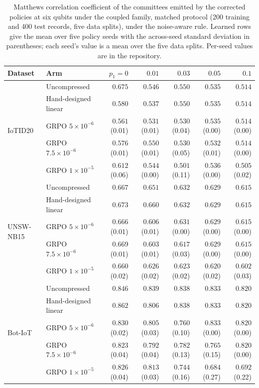 \begin{table}[t]
\centering
\footnotesize
\setlength{\tabcolsep}{2.5pt}
\caption{Matthews correlation coefficient of the committees emitted by the corrected policies at
six qubits under the coupled family, matched protocol (200 training and 400 test records, five data splits),
under the noise-aware rule.
Learned rows give the mean over five policy seeds with the across-seed standard deviation in
parentheses; each seed's value is a mean over the five data splits.
Per-seed values are in the repository.}
\label{tab:compdownstream-nwe}
\begin{tabular}{@{}llrrrrr@{}}
\toprule
Dataset & Arm & $p_1 = 0$ & $0.01$ & $0.03$ & $0.05$ & $0.1$ \\
\midrule
\multirow{5}{*}{IoTID20}
 & Uncompressed & $0.675$ & $0.546$ & $0.550$ & $0.535$ & $0.514$ \\
 & Hand-designed linear & $0.580$ & $0.537$ & $0.550$ & $0.535$ & $0.514$ \\
 & GRPO $5\times10^{-6}$ & $0.561$ (0.01) & $0.531$ (0.01) & $0.530$ (0.04) & $0.535$ (0.00) & $0.514$ (0.00) \\
 & GRPO $7.5\times10^{-6}$ & $0.576$ (0.01) & $0.550$ (0.01) & $0.530$ (0.05) & $0.532$ (0.01) & $0.514$ (0.00) \\
 & GRPO $1\times10^{-5}$ & $0.612$ (0.06) & $0.544$ (0.00) & $0.501$ (0.11) & $0.536$ (0.00) & $0.505$ (0.02) \\
\midrule
\multirow{5}{*}{UNSW-NB15}
 & Uncompressed & $0.667$ & $0.651$ & $0.632$ & $0.629$ & $0.615$ \\
 & Hand-designed linear & $0.673$ & $0.660$ & $0.632$ & $0.629$ & $0.615$ \\
 & GRPO $5\times10^{-6}$ & $0.666$ (0.01) & $0.606$ (0.01) & $0.631$ (0.00) & $0.629$ (0.00) & $0.615$ (0.00) \\
 & GRPO $7.5\times10^{-6}$ & $0.669$ (0.01) & $0.603$ (0.01) & $0.617$ (0.03) & $0.629$ (0.00) & $0.615$ (0.00) \\
 & GRPO $1\times10^{-5}$ & $0.660$ (0.02) & $0.626$ (0.02) & $0.623$ (0.02) & $0.620$ (0.02) & $0.602$ (0.03) \\
\midrule
\multirow{5}{*}{Bot-IoT}
 & Uncompressed & $0.846$ & $0.839$ & $0.838$ & $0.833$ & $0.820$ \\
 & Hand-designed linear & $0.862$ & $0.806$ & $0.838$ & $0.833$ & $0.820$ \\
 & GRPO $5\times10^{-6}$ & $0.830$ (0.02) & $0.805$ (0.03) & $0.760$ (0.10) & $0.833$ (0.00) & $0.820$ (0.00) \\
 & GRPO $7.5\times10^{-6}$ & $0.823$ (0.04) & $0.792$ (0.04) & $0.782$ (0.13) & $0.765$ (0.15) & $0.820$ (0.00) \\
 & GRPO $1\times10^{-5}$ & $0.826$ (0.04) & $0.813$ (0.03) & $0.744$ (0.16) & $0.684$ (0.27) & $0.692$ (0.22) \\
\bottomrule
\end{tabular}
\end{table}
